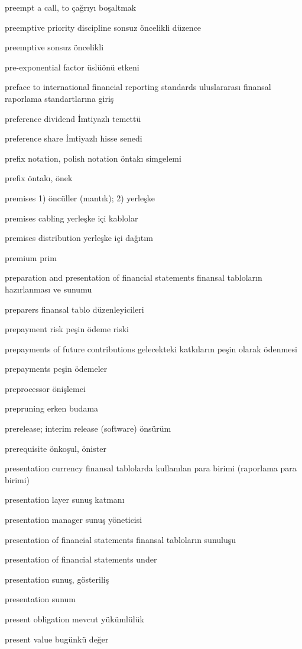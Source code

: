 \documentclass[12pt,fleqn]{article}\usepackage{../../common}
\begin{document}
preempt a call, to çağrıyı boşaltmak

preemptive priority discipline sonsuz öncelikli düzence

preemptive sonsuz öncelikli

pre-exponential factor üslüönü etkeni

preface to international financial reporting standards uluslararası finansal raporlama standartlarına giriş

preference dividend İmtiyazlı temettü

preference share İmtiyazlı hisse senedi

prefix notation, polish notation öntakı simgelemi

prefix öntakı, önek

premises 1) öncüller (mantık); 2) yerleşke

premises cabling yerleşke içi kablolar

premises distribution yerleşke içi dağıtım

premium prim

preparation and presentation of financial statements finansal tabloların hazırlanması ve sunumu

preparers finansal tablo düzenleyicileri

prepayment risk peşin ödeme riski

prepayments of future contributions gelecekteki katkıların peşin olarak ödenmesi

prepayments peşin ödemeler

preprocessor önişlemci

prepruning erken budama

prerelease; interim release (software) önsürüm

prerequisite önkoşul, önister

presentation currency finansal tablolarda kullanılan para birimi (raporlama para birimi)

presentation layer sunuş katmanı

presentation manager sunuş yöneticisi

presentation of financial statements finansal tabloların sunuluşu

presentation of financial statements under

presentation sunuş, gösteriliş

presentation sunum

present obligation mevcut yükümlülük

present value bugünkü değer
\end{document}
